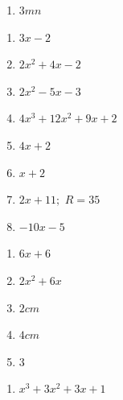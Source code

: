 \begin{description}
\begin{enumerate}[label=\thesection.2.\arabic*]
\begin{multicols}{3}
\begin{enumerate}[label=\alph*)]
                \item $3mn$
            \end{enumerate}
        \end{multicols}
        
        \ansitem{} \begin{multicols}{3}
            \begin{enumerate}[label=\alph*)]
                \item $3x-2$
                
                \item $2x^2+4x-2$
                
                \item $2x^2-5x-3$
                
                \item $4x^3 + 12x^2 + 9x+2$
                
                \item $4x+2$
                
                \item $x+2$
                
                \item $2x+11;$ $R=35$
                
                \item $-10x-5$
            \end{enumerate}
        \end{multicols}
        
        \ansitem{} \begin{multicols}{5}
            \begin{enumerate}[label=\alph*)]
                \item $6x+6$
                
                \item $2x^2+6x$
                
                \item $2cm$
                
                \item $4cm$
                
                \item $3$
            \end{enumerate}
        \end{multicols}
        
        
        \ansitem{} \begin{multicols}{3}
            \begin{enumerate}[label=\alph*)]
                \item $x^3+3x^2+3x+1$
                

\end{enumerate}
\end{multicols}
\end{enumerate}
\end{description}
